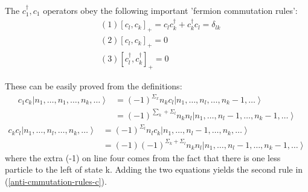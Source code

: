 \begin{imp}
The $c_{1}^{\dagger}, c_{1}$ operators obey the following important 'fermion commutation rules':
\begin{equation}
\begin{aligned}
&(1)\left[c_{l}, c_{k}\right]_{+}=c_{l} c_{k}^{\dagger}+c_{k}^{\dagger} c_{l}=\delta_{l k}\\
&(2)\left[c_{l}, c_{k}\right]_{+}=0\\
&(3)\left[c_{l}^{\dagger}, c_{k}^{\dagger}\right]_{+}=0
\end{aligned}
\label{anti-cmmutation-rules-c}
\end{equation}
\end{imp}
These can be easily proved from the definitions:
$$\begin{aligned}
c_{1} c_{k}\left|n_{1}, \ldots, n_{1}, \ldots, n_{k}, \ldots\right\rangle &=(-1)^{\Sigma_{x}} n_{k} c_{l}\left|n_{1}, \ldots, n_{l}, \ldots, n_{k}-1, \ldots\right\rangle \\
&=(-1)^{\sum_{k}+\Sigma_{l}} n_{k} n_{l}\left|n_{1}, \ldots, n_{l}-1, \ldots, n_{k}-1, \ldots\right\rangle
\end{aligned}$$
$$\begin{aligned}
c_{k} c_{l}\left|n_{1}, \ldots, n_{l}, \ldots, n_{k}, \ldots\right\rangle &=(-1)^{\Sigma_{l}} n_{l} c_{k}\left|n_{1}, \ldots, n_{l}-1, \ldots, n_{k}, \ldots\right\rangle \\
&=(-1)(-1)^{\Sigma_{k}+\Sigma_{l}} n_{k} n_{l}\left|n_{1}, \ldots, n_{l}-1, \ldots, n_{k}-1, \ldots\right\rangle
\end{aligned}$$
where the extra (-1) on line four comes from the fact that there is one less particle to the left of state k. Adding the two equations yields the second rule in (\ref{anti-cmmutation-rules-c}).